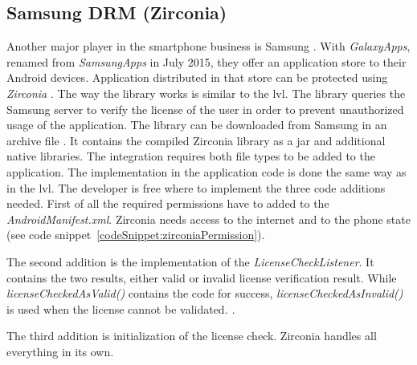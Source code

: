 \subsection{Samsung DRM (Zirconia)} \label{section:license-samsung}
Another major player in the smartphone business is Samsung \cite{comscoreMarket}.
With \textit{GalaxyApps}, renamed from \textit{SamsungApps} in July 2015, they offer an application store to their Android devices.
Application distributed in that store can be protected using \textit{Zirconia} \cite{samsungZirconia}.
\newline
The way the library works is similar to the \gls{lvl}.
The library queries the Samsung server to verify the license of the user in order to prevent unauthorized usage of the application.
The library can be downloaded from Samsung in an archive file  \cite{samsungZirconia}.
It contains the compiled Zirconia library as a \gls{jar} and additional native libraries.
The integration requires both file types to be added to the application.
\newline
The implementation in the application code is done the same way as in the \gls{lvl}.
The developer is free where to implement the three code additions needed.
\newline
First of all the required permissions have to added to the \textit{AndroidManifest.xml}.
Zirconia needs access to the internet and to the phone state (see code snippet~\ref{codeSnippet:zirconiaPermission}).
\newline

The second addition is the implementation of the \textit{LicenseCheckListener}.
It contains the two results, either valid or invalid license verification result.
While \textit{licenseCheckedAsValid()} contains the code for success, \textit{licenseCheckedAsInvalid()} is used when the license cannot be validated.
\textit.

The third addition is initialization of the license check.
Zirconia handles all everything in its own.
